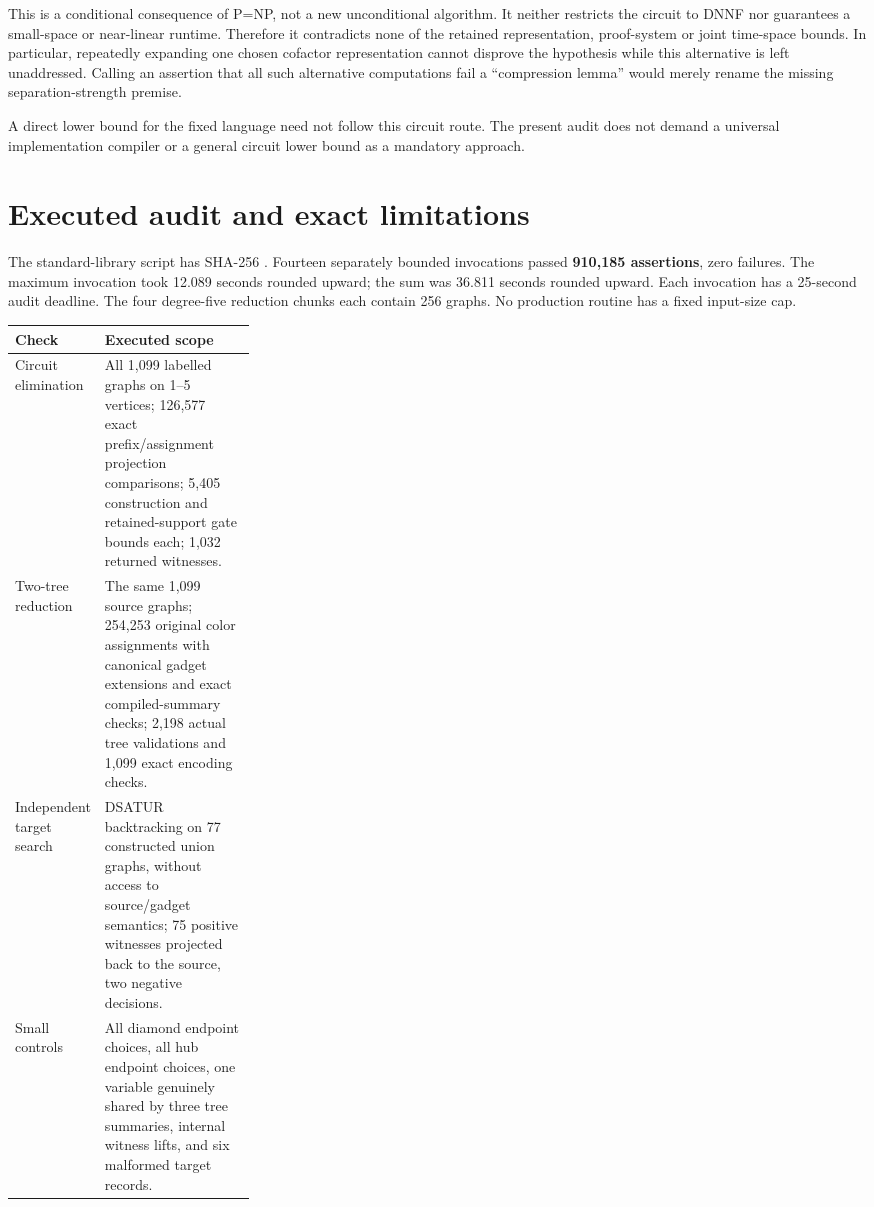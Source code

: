 \documentclass[11pt]{article}
\begin{document}
This is a conditional consequence of P=NP, not a new unconditional algorithm.
It neither restricts the circuit to DNNF nor guarantees a small-space or
near-linear runtime. Therefore it contradicts none of the retained
representation, proof-system or joint time-space bounds. In particular,
repeatedly expanding one chosen cofactor representation cannot disprove the
hypothesis while this alternative is left unaddressed. Calling an assertion
that all such alternative computations fail a ``compression lemma'' would
merely rename the missing separation-strength premise.

A direct lower bound for the fixed language need not follow this circuit
route. The present audit does not demand a universal implementation compiler
or a general circuit lower bound as a mandatory approach.

\section{Executed audit and exact limitations}
The standard-library script
has SHA-256
.
Fourteen separately bounded invocations passed \textbf{910,185 assertions},
zero failures. The maximum invocation took 12.089 seconds rounded upward;
the sum was 36.811 seconds rounded upward. Each invocation has a 25-second
audit deadline. The four degree-five reduction chunks each contain 256 graphs.
No production routine has a fixed input-size cap.

\begin{center}\small
\begin{tabularx}{\linewidth}{p{0.28\linewidth}X}
\toprule
Check & Executed scope\\\midrule
Circuit elimination & All 1,099 labelled graphs on 1--5 vertices;
126,577 exact prefix/assignment projection comparisons; 5,405 construction
and retained-support gate bounds each; 1,032 returned witnesses.\\
Two-tree reduction & The same 1,099 source graphs; 254,253 original color
assignments with canonical gadget extensions and exact compiled-summary checks;
2,198 actual tree validations and 1,099 exact encoding checks.\\
Independent target search & DSATUR backtracking on 77 constructed union graphs,
without access to source/gadget semantics; 75 positive witnesses projected
back to the source, two negative decisions.\\
Small controls & All diamond endpoint choices, all hub endpoint choices,
one variable genuinely shared by three tree summaries, internal witness lifts,
and six malformed target records.\\
\bottomrule\end{tabularx}\end{center}
\end{document}
